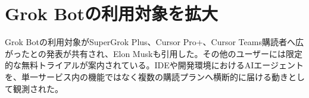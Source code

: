 \section{Grok Botの利用対象を拡大}
Grok Botの利用対象がSuperGrok Plus、Cursor Pro+、Cursor Teams購読者へ広がったとの発表が共有され、Elon Muskも引用した。その他のユーザーには限定的な無料トライアルが案内されている。IDEや開発環境におけるAIエージェントを、単一サービス内の機能ではなく複数の購読プランへ横断的に届ける動きとして観測された。
